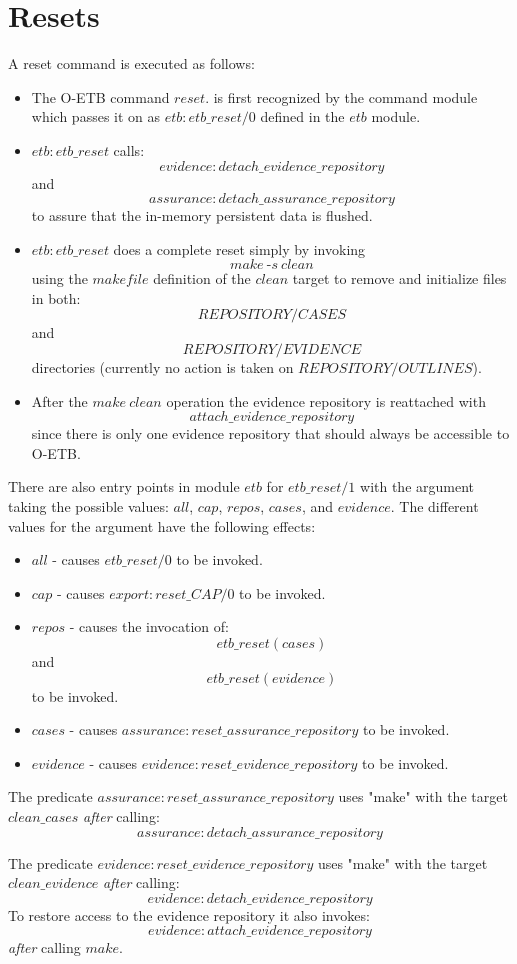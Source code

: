 \documentclass[12pt,twoside,a4paper]{article}
\begin{document}
\section{Resets}\label{sec:resets}
A reset command is executed as follows:
\begin{itemize}
    \item The O-ETB command $reset.$ is first recognized by the command module which passes it on as $etb:etb\_reset/0$ defined in the $etb$ module.
    \item $etb:etb\_reset$ calls: $$evidence:detach\_evidence\_repository$$ and $$assurance:detach\_assurance\_repository$$ to assure that the in-memory persistent data is flushed.
    \item $etb:etb\_reset$ does a complete reset simply by invoking $$make~\text{-}s~clean$$ using the $makefile$ definition of the $clean$ target to remove and initialize files in both: $$REPOSITORY/CASES$$ and $$REPOSITORY/EVIDENCE$$ directories (currently no action is taken on $REPOSITORY/OUTLINES$).
    \item After the $make~clean$ operation the evidence repository is reattached with $$attach\_evidence\_repository$$ since there is only one evidence repository that should always be accessible to O-ETB.
\end{itemize}
There are also entry points in module $etb$ for $etb\_reset/1$ with the argument taking the possible values: $all$, $cap$, $repos$, $cases$, and $evidence$.
The different values for the argument have the following effects:
\begin{itemize}
    \item $all$ - causes $etb\_reset/0$ to be invoked.
    \item $cap$ - causes $export:reset\_CAP/0$ to be invoked.
    \item $repos$ - causes the invocation of: $$etb\_reset(cases)$$
    and $$etb\_reset(evidence)$$ to be invoked.
    \item $cases$ - causes $assurance:reset\_assurance\_repository$ to be invoked.
    \item $evidence$ - causes $evidence:reset\_evidence\_repository$ to be invoked.
\end{itemize}
The predicate $assurance:reset\_assurance\_repository$ uses "make" with the target $clean\_cases$ \emph{after} calling: $$assurance:detach\_assurance\_repository$$

The predicate $evidence:reset\_evidence\_repository$ uses "make" with the target $clean\_evidence$ \emph{after} calling: $$evidence:detach\_evidence\_repository$$
To restore access to the evidence repository it also invokes: $$evidence:attach\_evidence\_repository$$ \emph{after} calling $make$.
\end{document}
